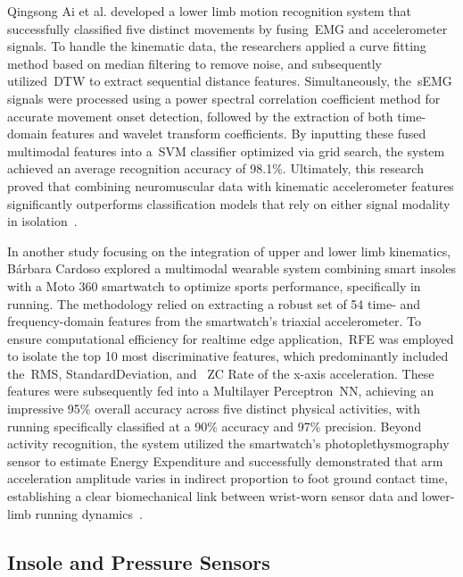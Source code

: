 Qingsong Ai et al. developed a lower limb motion recognition system that successfully classified five distinct 
movements by fusing~\gls{EMG} and accelerometer signals. To handle the kinematic data, the researchers applied a 
curve fitting method based on median filtering to remove noise, and subsequently utilized~\gls{DTW} to extract 
sequential distance features. Simultaneously, the~\gls{sEMG} signals were processed using a power spectral correlation 
coefficient method for accurate movement onset detection, followed by the extraction of both time-domain features 
and wavelet transform coefficients. By inputting these fused multimodal features into a~\gls{SVM} classifier 
optimized via grid search, the system achieved an average recognition accuracy of 98.1\%. Ultimately, this research 
proved that combining neuromuscular data with kinematic accelerometer features significantly outperforms classification 
models that rely on either signal modality in isolation~\cite{ResearchOnLowerLimbMotionRecognition}. 

In another study focusing on the integration of upper and lower limb kinematics, Bárbara Cardoso explored a multimodal 
wearable system combining smart insoles with a Moto 360 smartwatch to optimize sports performance, specifically in 
running. The methodology relied on extracting a robust set of 54 time- and frequency-domain features from the smartwatch's 
triaxial accelerometer. To ensure computational efficiency for realtime edge application,~\gls{RFE} was employed to 
isolate the top 10 most discriminative features, which predominantly included the~\gls{RMS}, StandardDeviation, and
~\gls{ZC} Rate of the x-axis acceleration. These features were subsequently fed into a Multilayer Perceptron~\gls{NN}, 
achieving an impressive 95\% overall accuracy across five distinct physical activities, with running specifically 
classified at a 90\% accuracy and 97\% precision. Beyond activity recognition, the system utilized the smartwatch's 
photoplethysmography sensor to estimate Energy Expenditure and successfully demonstrated that arm acceleration 
amplitude varies in indirect proportion to foot ground contact time, establishing a clear biomechanical link 
between wrist-worn sensor data and lower-limb running dynamics~\cite{porto}.

\subsection{Insole and Pressure Sensors}
\label{ssec:insole_preassure}

